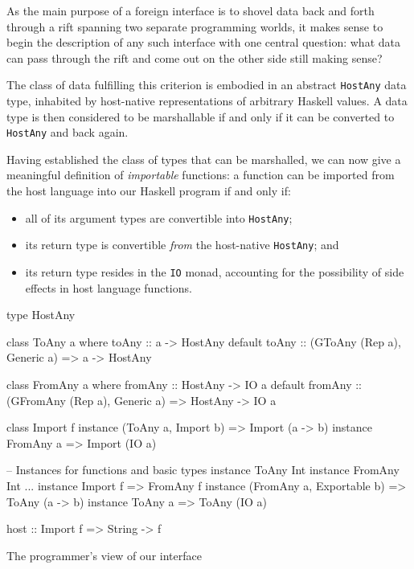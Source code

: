 \documentclass[preprint]{sigplanconf}
\begin{document}
As the main purpose of a foreign interface is to shovel data back and
forth through a rift spanning two separate programming worlds, it makes sense
to begin the description of any such interface with one central question:
what data can pass through the rift and come out on the other side still making
sense?

The class of data fulfilling this criterion is embodied in an
abstract \lstinline!HostAny! data type, inhabited by host-native
representations of arbitrary Haskell values.
A data type is then considered to be marshallable if and only if it can be
converted to \lstinline!HostAny! and back again.

Having established the class of types that can be marshalled, we can now give
a meaningful definition of \emph{importable} functions: a function can be
imported from the host language into our Haskell program if and only if:
\begin{itemize}
\item
  all of its argument types are convertible into \lstinline!HostAny!;
\item
  its return type is convertible \emph{from} the host-native
  \lstinline!HostAny!; and
\item
  its return type resides in the \lstinline!IO! monad, accounting for the
  possibility of side effects in host language functions.
\end{itemize}

\begin{listingfloat}
\begin{code}
type HostAny

class ToAny a where
  toAny :: a -> HostAny
  default toAny :: (GToAny (Rep a), Generic a)
                => a -> HostAny

class FromAny a where
  fromAny :: HostAny -> IO a
  default fromAny :: (GFromAny (Rep a), Generic a)
                  => HostAny -> IO a

class Import f
instance (ToAny a, Import b) => Import (a -> b)
instance FromAny a           => Import (IO a)

-- Instances for functions and basic types
instance ToAny Int
instance FromAny Int
...
instance Import f => FromAny f
instance (FromAny a, Exportable b) => ToAny (a -> b)
instance ToAny a => ToAny (IO a)

host :: Import f => String -> f
\end{code}
\caption{The programmer's view of our interface}
\label{lst:interface}
\end{listingfloat}
\end{document}

